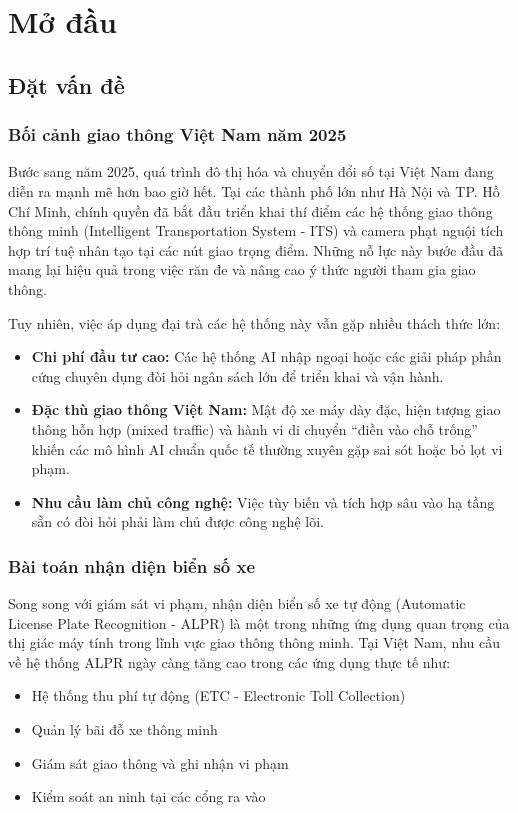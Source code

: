 \chapter{Mở đầu}
\label{ch:mo_dau}

\section{Đặt vấn đề}

\subsection{Bối cảnh giao thông Việt Nam năm 2025}
Bước sang năm 2025, quá trình đô thị hóa và chuyển đổi số tại Việt Nam đang diễn ra mạnh mẽ hơn bao giờ hết. Tại các thành phố lớn như Hà Nội và TP. Hồ Chí Minh, chính quyền đã bắt đầu triển khai thí điểm các hệ thống giao thông thông minh (Intelligent Transportation System - ITS) và camera phạt nguội tích hợp trí tuệ nhân tạo tại các nút giao trọng điểm. Những nỗ lực này bước đầu đã mang lại hiệu quả trong việc răn đe và nâng cao ý thức người tham gia giao thông.

Tuy nhiên, việc áp dụng đại trà các hệ thống này vẫn gặp nhiều thách thức lớn:
\begin{itemize}
    \item \textbf{Chi phí đầu tư cao:} Các hệ thống AI nhập ngoại hoặc các giải pháp phần cứng chuyên dụng đòi hỏi ngân sách lớn để triển khai và vận hành.
    \item \textbf{Đặc thù giao thông Việt Nam:} Mật độ xe máy dày đặc, hiện tượng giao thông hỗn hợp (mixed traffic) và hành vi di chuyển ``điền vào chỗ trống'' khiến các mô hình AI chuẩn quốc tế thường xuyên gặp sai sót hoặc bỏ lọt vi phạm.
    \item \textbf{Nhu cầu làm chủ công nghệ:} Việc tùy biến và tích hợp sâu vào hạ tầng sẵn có đòi hỏi phải làm chủ được công nghệ lõi.
\end{itemize}

\subsection{Bài toán nhận diện biển số xe}
Song song với giám sát vi phạm, nhận diện biển số xe tự động (Automatic License Plate Recognition - ALPR) là một trong những ứng dụng quan trọng của thị giác máy tính trong lĩnh vực giao thông thông minh. Tại Việt Nam, nhu cầu về hệ thống ALPR ngày càng tăng cao trong các ứng dụng thực tế như:
\begin{itemize}
    \item Hệ thống thu phí tự động (ETC - Electronic Toll Collection)
    \item Quản lý bãi đỗ xe thông minh
    \item Giám sát giao thông và ghi nhận vi phạm
    \item Kiểm soát an ninh tại các cổng ra vào
\end{itemize}

